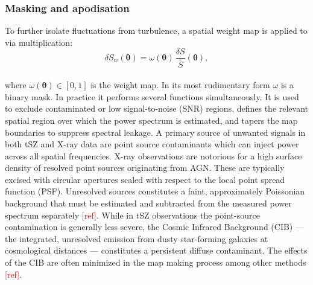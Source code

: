 
\subsubsection*{Masking and apodisation}

To further isolate fluctuations from turbulence, a spatial weight map is applied to via multiplication:
%
\begin{equation}
	\delta S_{w}(\boldsymbol{\theta}) = 
	\omega(\boldsymbol{\theta}) \, 
	\frac{\delta S}{\bar{S}}(\boldsymbol{\theta}),
	\label{eq:weightedResiduals}
\end{equation}
\\
where $\omega(\boldsymbol{\theta}) \in [0,1]$ is the weight map. In its most rudimentary form $\omega$ is a binary mask. In practice it performs several functions simultaneously. It is used to exclude contaminated or low signal-to-noise (SNR) regions, defines the relevant spatial region over which the power spectrum is estimated, and tapers the map boundaries to suppress spectral leakage.
\pbreak
A primary source of unwanted signals in both tSZ and X-ray data are point source contaminants which can inject power across all spatial frequencies. X-ray observations are notorious for a high surface density of resolved point sources originating from AGN. These are typically excised with circular apertures scaled with respect to the local point spread function (PSF). Unresolved sources constitutes a faint, approximately Poissonian background that must be estimated and subtracted from the measured power spectrum separately \textcolor{red}{[ref]}. While in tSZ  observations the point-source contamination is generally less severe, the Cosmic Infrared Background (CIB) — the integrated, unresolved emission from dusty star-forming galaxies at cosmological distances — constitutes a persistent diffuse contaminant. The effects of the CIB are often minimized in the map making process among other methods \textcolor{red}{[ref]}.

